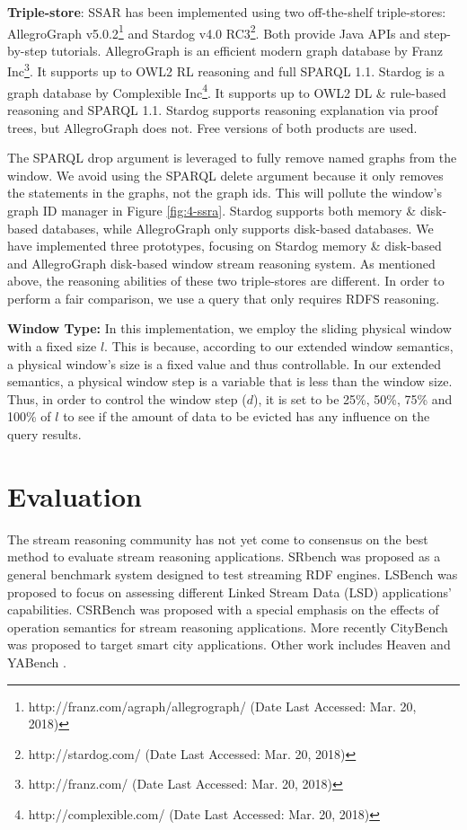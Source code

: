 \textbf{Triple-store}:
SSAR has been implemented using two off-the-shelf triple-stores: AllegroGraph v5.0.2\footnote{http://franz.com/agraph/allegrograph/ (Date Last Accessed: Mar. 20, 2018)} and Stardog v4.0 RC3\footnote{http://stardog.com/ (Date Last Accessed: Mar. 20, 2018)}. 
Both provide Java APIs and step-by-step tutorials. 
AllegroGraph is an efficient modern graph database by Franz Inc\footnote{http://franz.com/ (Date Last Accessed: Mar. 20, 2018)}. 
It supports up to OWL2 RL reasoning and full SPARQL 1.1. 
Stardog is a graph database by Complexible Inc\footnote{http://complexible.com/ (Date Last Accessed: Mar. 20, 2018)}. 
It supports up to OWL2 DL \& rule-based reasoning and SPARQL 1.1.
Stardog supports reasoning explanation via proof trees, but AllegroGraph does not. 
Free versions of both products are used.

The SPARQL drop argument is leveraged to fully remove named graphs from the window. 
We avoid using the SPARQL delete argument because it only removes the statements in the graphs, not the graph ids.
This will pollute the window's graph ID manager in Figure \ref{fig:4-ssra}.
Stardog supports both memory \& disk-based databases, while AllegroGraph only supports disk-based databases. 
We have implemented three prototypes, focusing on Stardog memory \& disk-based and AllegroGraph disk-based window stream reasoning system. 
As mentioned above, the reasoning abilities of these two triple-stores are different.
In order to perform a fair comparison, we use a query that only requires RDFS reasoning.
%

\textbf{Window Type:}
In this implementation, we employ the sliding physical window with a fixed size $l$.
This is because, according to our extended window semantics, a physical window's size is a fixed value and thus controllable. 
In our extended semantics, a physical window step is a variable that is less than the window size. 
Thus, in order to control the window step ($d$), it is set to be 25\%, 50\%, 75\% and 100\% of $l$ to see if the amount of data to be evicted has any influence on the query results.
%
\section{Evaluation}
The stream reasoning community has not yet come to consensus on the best method to evaluate stream reasoning applications. 
SRbench\cite{zhang2012srbench} was proposed as a general benchmark system designed to test streaming RDF engines. 
LSBench\cite{le2012linked} was proposed to focus on assessing different Linked Stream Data (LSD) applications' capabilities. 
CSRBench\cite{dell2013correctness} was proposed with a special emphasis on the effects of operation semantics for stream reasoning applications. 
More recently CityBench\cite{ali2015citybench} was proposed to target smart city applications. 
Other work includes Heaven \cite{tommasini2015heaven} and YABench \cite{benchmarkdemo}.

